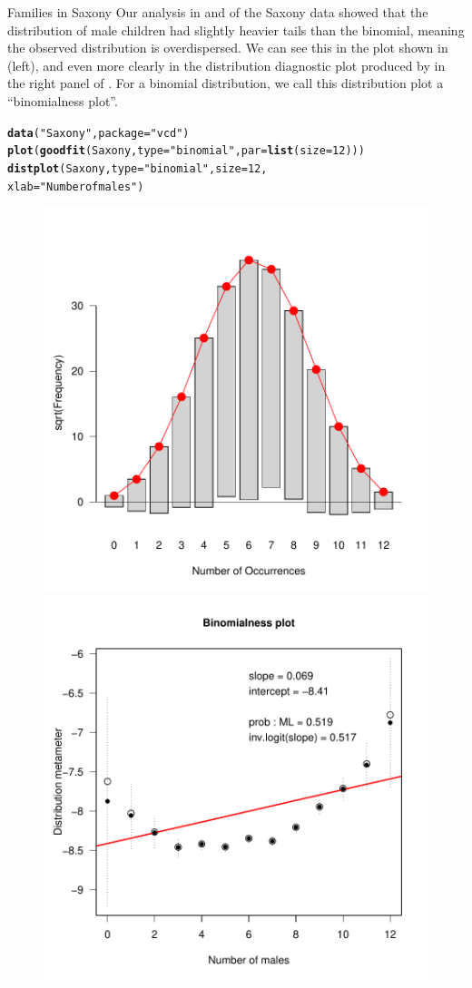 \documentclass[11pt]{book}\usepackage[]{graphicx}\usepackage[]{color}
\makeatletter
\newcommand{\hlnum}[1]{\textcolor[rgb]{0.686,0.059,0.569}{#1}}%
\newcommand{\hlstr}[1]{\textcolor[rgb]{0.192,0.494,0.8}{#1}}%
\newcommand{\hlstd}[1]{\textcolor[rgb]{0.345,0.345,0.345}{#1}}%
\newcommand{\hlkwc}[1]{\textcolor[rgb]{0.333,0.667,0.333}{#1}}%
\newcommand{\hlkwd}[1]{\textcolor[rgb]{0.737,0.353,0.396}{\textbf{#1}}}%
\newenvironment{kframe}{%
 \def\at@end@of@kframe{}%
 \ifinner\ifhmode%
  \def\at@end@of@kframe{\end{minipage}}%
  \begin{minipage}{\columnwidth}%
 \fi\fi%
 \def\FrameCommand##1{\hskip\@totalleftmargin \hskip-\fboxsep
 \colorbox{shadecolor}{##1}\hskip-\fboxsep
     \hskip-\linewidth \hskip-\@totalleftmargin \hskip\columnwidth}%
 \MakeFramed {\advance\hsize-\width
   \@totalleftmargin\z@ \linewidth\hsize
   \@setminipage}}%
 {\par\unskip\endMakeFramed%
 \at@end@of@kframe}
\newenvironment{knitrout}{}{} %
\renewenvironment{knitrout}{\small\renewcommand{\baselinestretch}{.85}}{} %
\makeatother
\begin{document}
\begin{Example}{Families in Saxony}
Our analysis in  and  of
the Saxony data
showed that the distribution of male children had slightly heavier tails
than the binomial, meaning the observed distribution is overdispersed.
We can see this in the  plot shown in  (left),
and even more clearly in the distribution diagnostic
plot produced
by  in the right panel of .
For a binomial distribution, we call
this distribution plot a ``binomialness plot''.

\begin{knitrout}
\color{fgcolor}\begin{kframe}
\begin{alltt}
\hlkwd{data}\hlstd{(}\hlstr{"Saxony"}\hlstd{,} \hlkwc{package}\hlstd{=}\hlstr{"vcd"}\hlstd{)}
\hlkwd{plot}\hlstd{(}\hlkwd{goodfit}\hlstd{(Saxony,} \hlkwc{type}\hlstd{=}\hlstr{"binomial"}\hlstd{,} \hlkwc{par}\hlstd{=}\hlkwd{list}\hlstd{(}\hlkwc{size}\hlstd{=}\hlnum{12}\hlstd{)))}
\hlkwd{distplot}\hlstd{(Saxony,} \hlkwc{type} \hlstd{=} \hlstr{"binomial"}\hlstd{,} \hlkwc{size} \hlstd{=} \hlnum{12}\hlstd{,}
  \hlkwc{xlab}\hlstd{=}\hlstr{"Number of males"}\hlstd{)}
\end{alltt}
\end{kframe}\begin{figure}[htbp]


\centerline{\includegraphics[width=.49\textwidth]{ch03/fig/distplot31} 
\includegraphics[width=.49\textwidth]{ch03/fig/distplot32} }


\end{figure}
\end{knitrout}
\end{Example}
\end{document}
